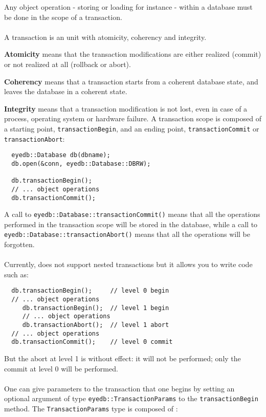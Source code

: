 \normalsize
{}
Any object operation - storing or loading for instance -
within a database must be done in the scope of a transaction.
\\
\\
A transaction is an unit with atomicity, coherency and integrity.
\be
\item {\bf Atomicity} means that the transaction modifications are either
realized (commit) or not realized at all (rollback or abort).
\item {\bf Coherency} means that a transaction starts from a coherent database
state, and leaves the database in a coherent state.
\item {\bf Integrity} means that a transaction modification is not lost, even
in case of a process, operating system or hardware failure.
\ee
A transaction scope is composed of a starting point, \texttt{transactionBegin},
and an ending point, \texttt{transactionCommit} or \texttt{transactionAbort}:
\verbsize
\begin{verbatim}
  eyedb::Database db(dbname);
  db.open(&conn, eyedb::Database::DBRW);

  db.transactionBegin();
  // ... object operations
  db.transactionCommit();
\end{verbatim}
\normalsize
A call to \texttt{eyedb::Database::transactionCommit()} means that all the
operations performed in the transaction scope will be stored in
the database, while a call to \texttt{eyedb::Database::transactionAbort()} means
that all the operations will be forgotten.
\\
\\
Currently, \eyedb does not support nested transactions but it allows you
to write code such as:
\verbsize
\begin{verbatim}
  db.transactionBegin();     // level 0 begin
  // ... object operations
     db.transactionBegin();  // level 1 begin
     // ... object operations
     db.transactionAbort();  // level 1 abort
  // ... object operations
  db.transactionCommit();    // level 0 commit
\end{verbatim}
\normalsize
But the abort at level 1 is without effect: it will
not be performed; only the commit at level 0 will be performed.
\\
\\
One can give parameters to the transaction that one begins by setting an
optional argument of type \texttt{eyedb::TransactionParams} to the
\texttt{transactionBegin} method. The \texttt{TransactionParams} type is
composed of :
